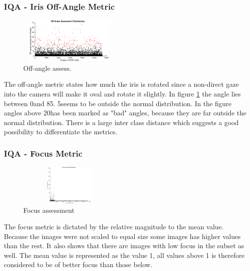 \subsubsection{IQA - Iris Off-Angle Metric}\vspace{-5mm}
	\begin{figure}
		\centering
		\includegraphics[height=2.25cm, width=5cm]{pics/dist_off_angle_deg_2}
		\caption{Off-angle assess. \cite{hugo}}
		\label{fig:ang}
	\end{figure}
The off-angle metric states how much the iris is rotated since a non-direct gaze
into the camera will make it oval and rotate it slightly. In figure
\ref{fig:ang} the angle lies between 0\degree and 85\degree.
5\degree seems to be outside the normal distribution. In the figure 
angles above 20\degree has been marked as "bad" angles, because they are far
outside the normal distribution.  There is a large inter class distance which
suggests a good possibility to differentiate the metrics. 

\vspace{-5mm}
\subsubsection{IQA - Focus Metric}\vspace{-5mm}
	\begin{figure}
		\centering
		\includegraphics[height=2cm, width=5cm]{pics/dist_focus_assess}
		\caption{Focus assessment \cite{hugo}}
		\label{fig:focus} 
	\end{figure}
The focus metric is dictated by the relative magnitude to the mean value.
Because the images were not scaled to equal size some images has higher values
than the rest.  It also shows that there are images with low focus in the subset
as well.  The mean value is represented as the value 1, all values above 1 is
therefore considered to be of better focus than those below.

